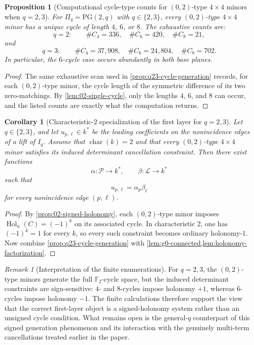 \documentclass[11pt]{amsart}
\numberwithin{equation}{section}
\theoremstyle{plain}
\newtheorem{proposition}[theorem]{Proposition}
\newtheorem{corollary}[theorem]{Corollary}
\theoremstyle{definition}
\theoremstyle{remark}
\newtheorem{remark}[theorem]{Remark}
\begin{document}
\begin{proposition}[Computational cycle-type counts for $(0,2)$-type $4\times4$ minors when $q=2,3$]
\label{prop:q23-cycle-type-counts}
For $\Pi_q=\mathrm{PG}(2,q)$ with $q\in\{2,3\}$, every $(0,2)$-type $4\times4$ minor has a unique cycle of length $4$, $6$, or $8$.
The exhaustive counts are:
\[
q=2:\qquad \#C_4=336,\quad \#C_6=420,\quad \#C_8=21,
\]
and
\[
q=3:\qquad \#C_4=37{,}908,\quad \#C_6=24{,}804,\quad \#C_8=702.
\]
In particular, the $6$-cycle case occurs abundantly in both base planes.
\end{proposition}

\begin{proof}
The same exhaustive scan used in \cref{prop:q23-cycle-generation} records, for each $(0,2)$-type minor, the cycle length of the
symmetric difference of its two zero-matchings. By \cref{lem:02-single-cycle}, only the lengths $4$, $6$, and $8$ can occur, and the
listed counts are exactly what the computation returns.
\end{proof}

\begin{corollary}[Characteristic-$2$ specialization of the first layer for $q=2,3$]
\label{cor:q23-gauge}
Let $q\in\{2,3\}$, and let $u_{p,\ell}\in k^*$ be the leading coefficients on the nonincidence edges of a lift of $I_q$.
Assume that $\operatorname{char}(k)=2$ and that every $(0,2)$-type $4\times4$ minor satisfies its induced determinant cancellation
constraint. Then there exist functions
\[
\alpha:\mathcal P\to k^*, \qquad \beta:\mathcal L\to k^*
\]
such that
\[
u_{p,\ell}=\alpha_p\beta_\ell
\]
for every nonincidence edge $(p,\ell)$.
\end{corollary}

\begin{proof}
By \cref{prop:02-signed-holonomy}, each $(0,2)$-type minor imposes $\operatorname{Hol}_{u}(C)=(-1)^k$ on its associated cycle.
In characteristic $2$, one has $(-1)^k=1$ for every $k$, so every such constraint becomes ordinary holonomy-$1$.
Now combine \cref{prop:q23-cycle-generation} with \cref{lem:g0-connected,lem:holonomy-factorization}.
\end{proof}

\begin{remark}[Interpretation of the finite enumerations]
For $q=2,3$, the $(0,2)$-type minors generate the full $\mathbb F_2$-cycle space, but the induced determinant constraints are sign-sensitive: $4$- and $8$-cycles impose holonomy $+1$, whereas $6$-cycles impose holonomy $-1$. The finite calculations therefore support the view that the correct first-layer object is a signed-holonomy system rather than an unsigned cycle condition. What remains open is the general-$q$ counterpart of this signed generation phenomenon and its interaction with the genuinely multi-term cancellations treated earlier in the paper.
\end{remark}




\end{document}
